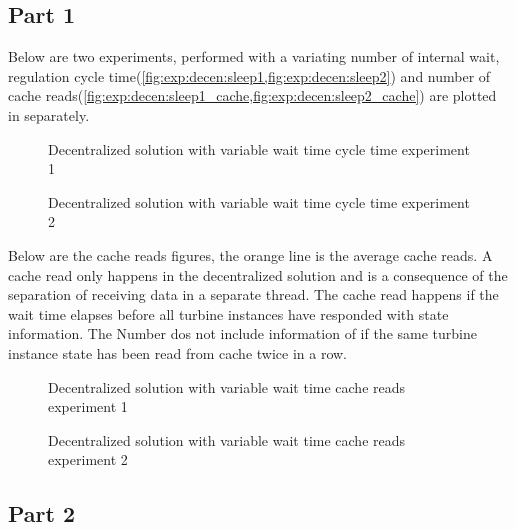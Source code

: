\subsection{Part 1}

Below are two  experiments, performed with a variating number of internal wait, regulation cycle time(\cref{fig:exp:decen:sleep1,fig:exp:decen:sleep2}) and number of cache reads(\cref{fig:exp:decen:sleep1_cache,fig:exp:decen:sleep2_cache}) are plotted in separately.

\begin{figure}[h]
	\centering
	
	\caption{Decentralized solution with variable wait time cycle time experiment 1}
	\label{fig:exp:decen:sleep1}
\end{figure}

\begin{figure}[h]
	\centering
		
	\caption{Decentralized solution with variable wait time cycle time experiment 2}
	\label{fig:exp:decen:sleep2}
\end{figure}

Below are the cache reads figures, the orange line is the average cache reads.
A cache read only happens in the decentralized solution and is a consequence of the separation of receiving data in a separate thread.
The cache read happens if the wait time elapses before all turbine instances have responded with state information. The Number dos not include information of if the same turbine instance state has been read from cache twice in a row.

\begin{figure}[h]
	\centering
	
	\caption{Decentralized solution with variable wait time cache reads experiment 1}
	\label{fig:exp:decen:sleep1_cache}
\end{figure}


\begin{figure}[h]
	\centering
	
	\caption{Decentralized solution with variable wait time cache reads experiment 2}
	\label{fig:exp:decen:sleep2_cache}
\end{figure}

\subsection{Part 2}

